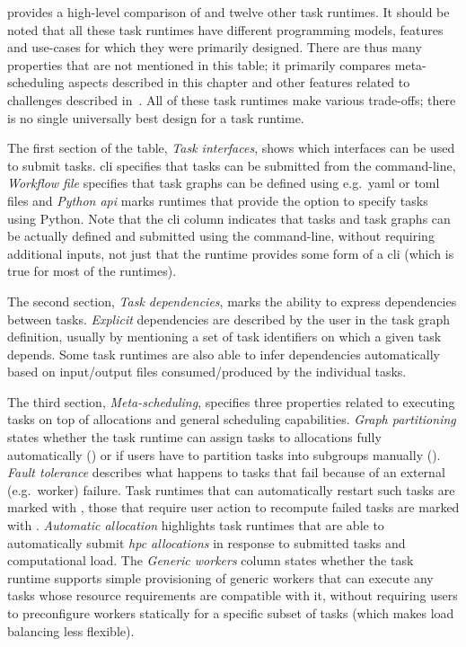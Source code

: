  provides a high-level comparison of \hyperqueue{} and twelve
other task runtimes. It should be noted that all these task runtimes have different programming
models, features and use-cases for which they were primarily designed. There are thus many
properties that are not mentioned in this table; it primarily compares meta-scheduling aspects
described in this chapter and other features related to challenges described
in~. All of these task runtimes make various trade-offs; there is no single
universally best design for a task runtime.

The first section of the table, \emph{Task interfaces}, shows which interfaces can be used to
submit tasks. \gls{cli} specifies that tasks can be submitted from the command-line,
\emph{Workflow file} specifies that task graphs can be defined using e.g.\
\gls{yaml} or \gls{toml} files and \emph{Python \gls{api}} marks runtimes
that provide the option to specify tasks using Python. Note that the \gls{cli} column
indicates that tasks and task graphs can be actually defined and submitted using the command-line,
without requiring additional inputs, not just that the runtime provides some form of a
\gls{cli} (which is true for most of the runtimes).

The second section, \emph{Task dependencies}, marks the ability to express dependencies between
tasks. \emph{Explicit} dependencies are described by the user in the task graph definition,
usually by mentioning a set of task identifiers on which a given task depends. Some task runtimes
are also able to infer dependencies automatically based on input/output files consumed/produced by
the individual tasks.

The third section, \emph{Meta-scheduling}, specifies three properties related to executing tasks
on top of allocations and general scheduling capabilities. \emph{Graph partitioning} states whether
the task runtime can assign tasks to allocations fully automatically (\automaticmap) or if users
have to partition tasks into subgroups manually (\manualmap). \emph{Fault tolerance} describes
what happens to tasks that fail because of an external (e.g.\ worker) failure. Task runtimes that
can automatically restart such tasks are marked with \automaticft, those that require user action
to recompute failed tasks are marked with \manualft. \emph{Automatic allocation} highlights task
runtimes that are able to automatically submit \emph{\gls{hpc} allocations} in response to submitted
tasks and computational load. The \emph{Generic workers} column states whether the task runtime
supports simple provisioning of generic workers that can execute any tasks whose resource
requirements are compatible with it, without requiring users to preconfigure workers statically for
a specific subset of tasks (which makes load balancing less flexible).

